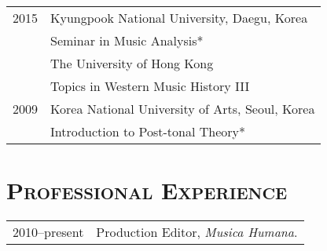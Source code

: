 \documentclass[a4paper,11pt]{article}
\begin{document}
\begin{tabular}{p{2.5cm} l}
    2015 & Kyungpook National University, Daegu, Korea\\
    & Seminar in Music Analysis*\\[1mm]
    
    & The University of Hong Kong\\
    & Topics in Western Music History III\\[1mm]
    
%    
%    
    2009 & Korea National University of Arts, Seoul, Korea\\
    & Introduction to Post-tonal Theory*\\    
  \end{tabular}
  
  \vspace{2.5mm}
  
  \section*{\textsc{Professional Experience}}
  
  \hspace*{-0.25cm}
  \begin{tabular}{p{2.5cm} l}
    2010--present & Production Editor, \textit{Musica Humana}.
  \end{tabular}
  
  \vspace{2.5mm}
  
\end{document}
